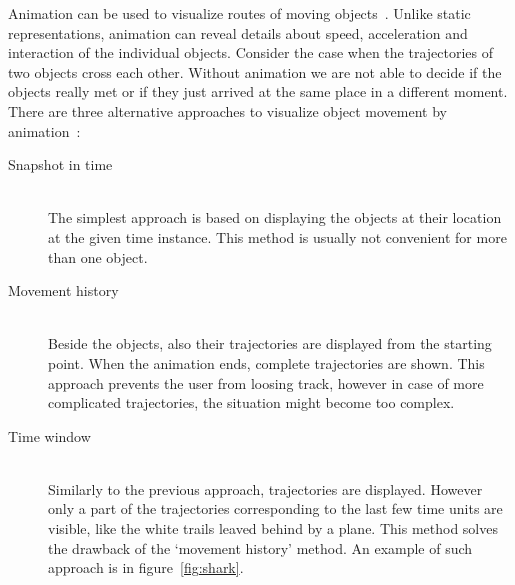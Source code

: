 \documentclass[a4paper,12pt,oneside]{book}
\begin{document}
Animation can be used to visualize routes of moving objects~\cite{andrienko2003exploratory}.
Unlike static representations, animation can reveal details about speed, acceleration and interaction
of the individual objects. Consider the case when the trajectories of two objects cross each other.
Without animation we are not able to decide if the objects really met or
if they just arrived at the same place in a different moment.
There are three alternative approaches to visualize object movement by animation~\cite{andrienko2003exploratory}:
    \begin{description}
        \item[Snapshot in time]~\\
        The simplest approach is based on displaying the objects
        at their location at the given time instance. This method is usually not convenient for more than one object.
        \item[Movement history]~\\
        Beside the objects, also their trajectories are displayed from the starting point.
        When the animation ends, complete trajectories are shown. This approach prevents the user from loosing track,
        however in case of more complicated trajectories, the situation might become too complex.
        \item[Time window]~\\
        Similarly to the previous approach, trajectories are displayed.
        However only a part of the trajectories corresponding to the last few time units are visible,
        like the white trails leaved behind by a plane.
        This method solves the drawback of the `movement history' method.
        An example of such approach is in figure~\ref{fig:shark}.
    \end{description}
\end{document}
